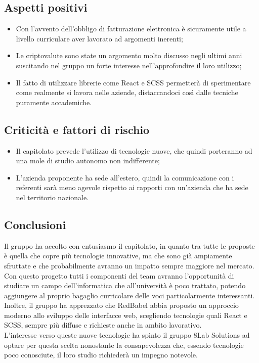 \subsection{Aspetti positivi}
\begin{itemize}
	\item Con l'avvento dell'obbligo di fatturazione elettronica è sicuramente
	utile a livello curriculare aver lavorato ad argomenti inerenti;
	\item Le criptovalute sono state un argomento molto discusso negli ultimi anni 
suscitando nel gruppo un forte interesse nell'approfondire il loro utilizzo;
	
	\item Il fatto di utilizzare librerie come React e SCSS permetterà di
	sperimentare come realmente si lavora nelle aziende, distaccandoci così dalle 
tecniche puramente accademiche.
\end{itemize}


\subsection{Criticità  e fattori di rischio}

\begin{itemize}
	\item Il capitolato prevede l'utilizzo di tecnologie nuove, che quindi 
porteranno ad una mole di studio autonomo non indifferente;
	\item L'azienda proponente ha sede all'estero, quindi la comunicazione con i 
referenti sarà meno agevole rispetto ai rapporti con un'azienda che ha sede nel 
territorio nazionale.
\end{itemize}

\subsection{Conclusioni} Il gruppo ha accolto con entusiasmo il capitolato, in 
quanto tra tutte le proposte è quella che copre più tecnologie innovative, ma 
che sono già ampiamente sfruttate e che probabilmente avranno un impatto sempre 
maggiore nel mercato. Con questo progetto tutti i componenti del team avranno 
l'opportunità di studiare un campo dell'informatica che all'università è poco 
trattato, potendo aggiungere al proprio bagaglio curricolare delle voci 
particolarmente interessanti. Inoltre, il gruppo ha apprezzato che RedBabel abbia
proposto un approccio moderno allo sviluppo delle interfacce web, scegliendo 
tecnologie quali React e SCSS, sempre più diffuse e richieste anche in ambito lavorativo.\\
L'interesse verso queste nuove tecnologie ha spinto il gruppo 8Lab Solutions ad 
optare per questa scelta nonostante la consapevolezza che, essendo tecnologie 
poco conosciute, il loro studio richiederà un impegno notevole.



